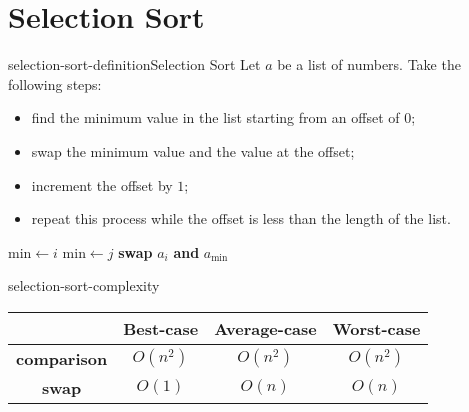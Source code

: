\documentclass[preview]{standalone}
\begin{document}
\genpage

\section{Selection Sort}

\begin{snippetdefinition}{selection-sort-definition}{Selection Sort}
    Let \(a\) be a list of numbers. Take the following steps:
    \begin{itemize}
        \item find the minimum value in the list starting from an offset of \(0\);
        \item swap the minimum value and the value at the offset;
        \item increment the offset by \(1\);
        \item repeat this process while the offset is less than the length of the list.
    \end{itemize}
    \hr
    \begin{algorithmic}[1] 
            \State \(\text{min}\gets i\)
                    \State \(\text{min}\gets j\)
                \EndIf
            \EndFor
            \State \textbf{swap} \(a_i\) \textbf{and} \(a_{\text{min}}\)
        \EndFor
    \end{algorithmic}
    \hr
\end{snippetdefinition}

\begin{snippet}{selection-sort-complexity}
    \def\arraystretch{1.5}
    \begin{center}
        \begin{tabular}{ |c|c|c|c| }
            \hline
            & \textbf{Best-case} & \textbf{Average-case} &\textbf{Worst-case} \\
            \hline
            \textbf{comparison} & \(O(n^2)\) & \(O(n^2)\) & \(O(n^2)\) \\ 
            \hline
            \textbf{swap} & \(O(1)\) & \(O(n)\) & \(O(n)\) \\ 
            \hline
        \end{tabular}
    \end{center}
    \vspace{0.5cm}
\end{snippet}
\end{document}
